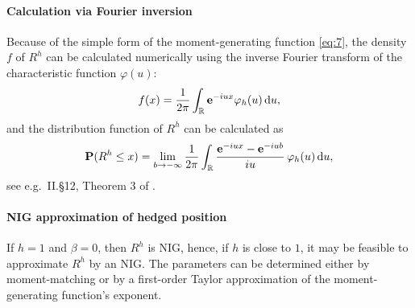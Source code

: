 \paragraph*{Calculation via Fourier inversion}
\label{sec:calc-via-four}

Because of the simple form of the moment-generating function
\eqref{eq:7}, the density $f$ of $R^h$ can be calculated numerically
using the inverse Fourier transform of the characteristic function
$\varphi(u) $:
\begin{equation*}
  f(x) = \frac{1}{2\pi} \int_{\mathbb{R}} {\bf e}^{-i u x} \varphi_h(u)\, {\rm d} u, 
\end{equation*}
and the distribution function of $R^h$ can be calculated as
\begin{equation*}
  {\bf P}(R^h\leq x) = \lim_{b\rightarrow-\infty} \frac{1}{2\pi} \int_{\mathbb{R}}
  \frac{{\bf e}^{-i u x} - {\bf e}^{-i u b}}{i u}\, \varphi_h(u)\, {\rm d} u,
\end{equation*}
see e.g.\ II.\S 12, Theorem 3 of \citep{Shiryaev1996}.


\paragraph*{NIG approximation of hedged position}
\label{sec:nig-appr-hedg}

If $h=1$ and $\beta=0$, then $R^h$ is NIG, hence, if $h$ is close to
$1$, it may be feasible to approximate $R^h$ by an NIG. The parameters
can be determined either by moment-matching or by a first-order Taylor
approximation of the moment-generating function's exponent.


